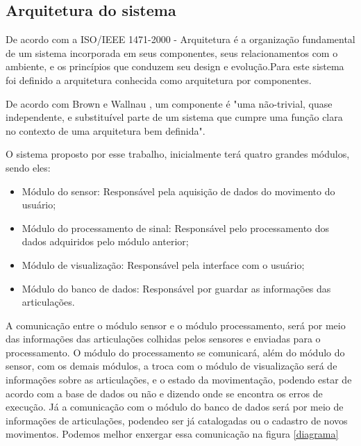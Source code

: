 \subsection{Arquitetura do sistema}
\label{Sec:arquitetura}
  De acordo com a ISO/IEEE 1471-2000 - Arquitetura é a organização fundamental 
de um sistema incorporada em seus componentes, seus relacionamentos com o 
ambiente, e os princípios que conduzem seu design e evolução.Para este sistema 
foi definido a arquitetura conhecida como arquitetura por componentes.
  
  De acordo com Brown e Wallnau \cite{brownWall}, um componente é 
"uma não-trivial, quase independente, e substituível parte de um sistema que 
cumpre uma função clara no contexto de uma arquitetura bem definida".

  O sistema proposto por esse trabalho, inicialmente terá quatro grandes módulos,
 sendo eles:

  \begin{itemize}
  \item Módulo do sensor: Responsável pela aquisição de dados do movimento do 
  usuário;
  \item Módulo do processamento de sinal: Responsável pelo processamento dos dados
  adquiridos pelo módulo anterior;
  \item Módulo de visualização: Responsável pela interface com o usuário;
  \item Módulo do banco de dados: Responsável por guardar as informações das articulações.
  \end{itemize} 

  A comunicação entre o módulo sensor e o módulo processamento, será por meio 
das informações das articulações colhidas pelos sensores e enviadas para o processamento.
O módulo do processamento se comunicará, além do módulo do sensor, com os demais
módulos, a troca com o módulo de visualização será de  informações sobre as articulações,
e o estado da movimentação, podendo estar de acordo com a base de dados ou não e 
dizendo onde se encontra os erros de execução. Já a comunicação com o módulo do
banco de dados será por meio de informações de articulações, podendeo ser já catalogadas
 ou o cadastro de novos movimentos. Podemos melhor enxergar essa comunicação na 
figura \ref{diagrama}

